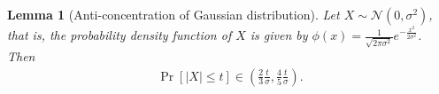 \documentclass[11pt]{article}
\newcommand{\N}{\mathcal{N}}
\newtheorem{lemma}[theorem]{Lemma}
\begin{document}
\begin{lemma}[Anti-concentration of Gaussian distribution]\label{lem:anti_gaussian}
Let $X\sim {\N}(0,\sigma^2)$,
that is,
the probability density function of $X$ is given by $\phi(x)=\frac 1 {\sqrt{2\pi\sigma^2}}e^{-\frac {x^2} {2\sigma^2} }$.
Then
\begin{align*}
    \Pr[|X|\leq t]\in \left( \frac 2 3\frac t \sigma, \frac 4 5\frac t \sigma \right).
\end{align*}
\end{lemma}




\end{document}
